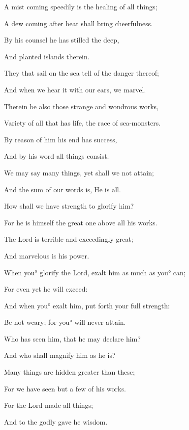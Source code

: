 {\par }{\Q {}A mist coming speedily is the healing of all things;
\par }{\Q A dew coming after heat shall bring cheerfulness.
\par }{\Q {}By his counsel he has stilled the deep,
\par }{\Q And
 planted islands therein.
\par }{\Q {}They that sail on the sea tell of the danger thereof;
\par }{\Q And when we hear it with our ears, we marvel.
\par }{\Q {}Therein be also those strange and wondrous works,
\par }{\Q Variety of all that has life, the
 race of sea-monsters.
\par }{\Q {}By reason of him his end has success,
\par }{\Q And by his word all things consist.
\par }{\BB \par }{\Q {}We may say many things, yet shall we not attain;
\par }{\Q And the sum of our words is, He is all.
\par }{\Q {}How shall we have strength to glorify him?
\par }{\Q For he is himself the great one above all his works.
\par }{\Q {}The Lord is terrible and exceedingly great;
\par }{\Q And marvelous is his power.
\par }{\Q {}When you° glorify the Lord, exalt him as much as you° can;
\par }{\Q For even yet he will exceed:
\par }{\Q And when you° exalt him, put forth your full strength:
\par }{\Q Be not weary; for you° will never attain.
\par }{\Q {}Who has seen him, that he may declare him?
\par }{\Q And who shall magnify him as he is?
\par }{\Q {}Many things are hidden greater than these;
\par }{\Q For we have seen but a few of his works.
\par }{\Q {}For the Lord made all things;
\par }{\Q And to the godly gave he wisdom.
\par }{\BB \par }
